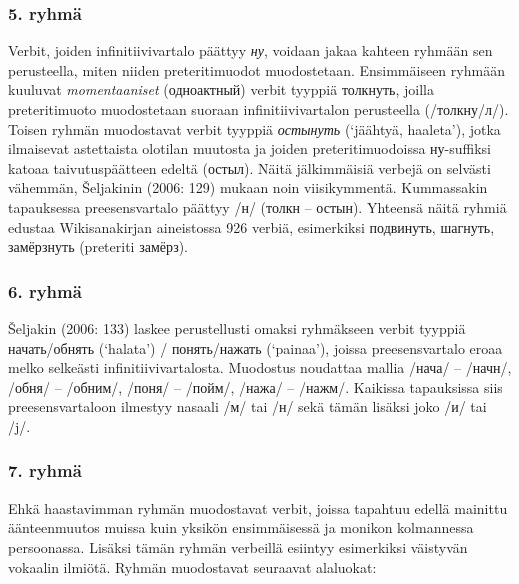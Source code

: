 \documentclass[]{scrartcl}
\begin{document}
\subsubsection{5. ryhmä}\label{ryhmuxe4-4}

Verbit, joiden infinitiivivartalo päättyy \emph{ну}, voidaan jakaa
kahteen ryhmään sen perusteella, miten niiden preteritimuodot
muodostetaan. Ensimmäiseen ryhmään kuuluvat \emph{momentaaniset}
(одноактный) verbit tyyppiä толкнуть, joilla preteritimuoto muodostetaan
suoraan infinitiivivartalon perusteella (/толкну/л/). Toisen ryhmän
muodostavat verbit tyyppiä \emph{остынуть} (`jäähtyä, haaleta'), jotka
ilmaisevat astettaista olotilan muutosta ja joiden preteritimuodoissa
ну-suffiksi katoaa taivutuspäätteen edeltä (остыл). Näitä jälkimmäisiä
verbejä on selvästi vähemmän, Šeljakinin (2006: 129) mukaan noin
viisikymmentä. Kummassakin tapauksessa preesensvartalo päättyy /н/
(толкн -- остын). Yhteensä näitä ryhmiä edustaa Wikisanakirjan
aineistossa 926 verbiä, esimerkiksi подвинуть, шагнуть, замёрзнуть
(preteriti замёрз).

\subsubsection{6. ryhmä}\label{ryhmuxe4-5}

Šeljakin (2006: 133) laskee perustellusti omaksi ryhmäkseen verbit
tyyppiä начать/обнять (`halata') / понять/нажать (`painaa'), joissa
preesensvartalo eroaa melko selkeästi infinitiivivartalosta. Muodostus
noudattaa mallia /нача/ -- /начн/, /обня/ -- /обним/, /поня/ -- /пойм/,
/нажа/ -- /нажм/. Kaikissa tapauksissa siis preesensvartaloon ilmestyy
nasaali /м/ tai /н/ sekä tämän lisäksi joko /и/ tai /j/.

\subsubsection{7. ryhmä}\label{ryhmuxe4-6}

Ehkä haastavimman ryhmän muodostavat verbit, joissa tapahtuu edellä
mainittu äänteenmuutos muissa kuin yksikön ensimmäisessä ja monikon
kolmannessa persoonassa. Lisäksi tämän ryhmän verbeillä esiintyy
esimerkiksi väistyvän vokaalin ilmiötä. Ryhmän muodostavat seuraavat
alaluokat:
\end{document}
